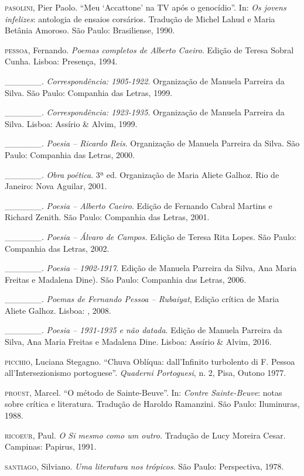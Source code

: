 \begin{Parskip}
\textsc{pasolini}, Pier Paolo. ``Meu `Accattone' na TV após o
genocídio''. In: \emph{Os jovens infelizes}: antologia de ensaios
corsários. Tradução de Michel Lahud e Maria Betânia Amoroso. São Paulo:
Brasiliense, 1990.

\textsc{pessoa}, Fernando. \emph{Poemas completos de Alberto Caeiro}.
Edição de Teresa Sobral Cunha. Lisboa: Presença, 1994.

\_\_\_\_\_\_. \emph{Correspondência: 1905-1922}. Organização de Manuela
Parreira da Silva. São Paulo: Companhia das Letras, 1999.

\_\_\_\_\_\_. \emph{Correspondência: 1923-1935}. Organização de Manuela
Parreira da Silva. Lisboa: Assírio \& Alvim, 1999.

\_\_\_\_\_\_. \emph{Poesia -- Ricardo Reis}. Organização de Manuela
Parreira da Silva. São Paulo: Companhia das Letras, 2000.

\_\_\_\_\_\_. \emph{Obra poética}. 3ª ed. Organização de Maria Aliete
Galhoz. Rio de Janeiro: Nova Aguilar, 2001.

\_\_\_\_\_\_. \emph{Poesia -- Alberto Caeiro}. Edição de Fernando Cabral
Martins e Richard Zenith. São Paulo: Companhia das Letras, 2001.

\_\_\_\_\_\_. \emph{Poesia -- Álvaro de Campos.} Edição de Teresa Rita
Lopes. São Paulo: Companhia das Letras, 2002.

\_\_\_\_\_\_. \emph{Poesia -- 1902-1917}. Edição de Manuela Parreira da
Silva, Ana Maria Freitas e Madalena Dine). São Paulo: Companhia das
Letras, 2006.

\_\_\_\_\_\_. \emph{Poemas de Fernando Pessoa -- Rubaiyat}, Edição
crítica de Maria Aliete Galhoz. Lisboa: , 2008.

\_\_\_\_\_\_. \emph{Poesia -- 1931-1935 e não datada}. Edição de Manuela
Parreira da Silva, Ana Maria Freitas e Madalena Dine. Lisboa: Assírio \&
Alvim, 2016.

\textsc{picchio}, Luciana Stegagno. ``Chuva Oblíqua: dall'Infinito
turbolento di F. Pessoa all'Intersezionismo portoguese''. \emph{Quaderni
Portoguesi}, n. 2, Pisa, Outono 1977.

\textsc{proust}, Marcel. ``O método de Sainte-Beuve''. In: \emph{Contre
Sainte-Beuve}: notas sobre crítica e literatura. Tradução de Haroldo
Ramanzini. São Paulo: Iluminuras, 1988.

\textsc{ricoeur}, Paul. \emph{O Si mesmo como um outro}. Tradução de
Lucy Moreira Cesar. Campinas: Papirus, 1991.

\textsc{santiago}, Silviano. \emph{Uma literatura nos trópicos}. São
Paulo: Perspectiva, 1978.


\end{Parskip}
